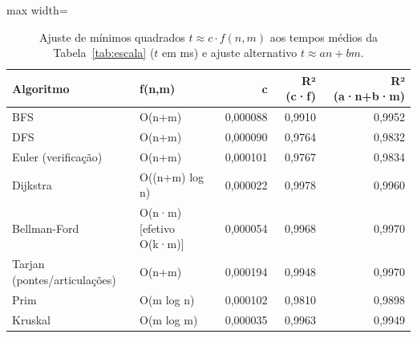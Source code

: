 \begin{table}[!htb]
\centering
\caption{Ajuste de mínimos quadrados $t \approx c\cdot f(n,m)$ aos tempos médios da Tabela~\ref{tab:escala} ($t$ em ms) e ajuste alternativo $t \approx a n + b m$.}
\label{tab:ajustes}
\begin{adjustbox}{max width=\linewidth}
\begin{tabular}{llrrr}
\toprule
Algoritmo & f(n,m) & c & R² (c·f) & R² (a·n+b·m) \\
\midrule
BFS & O(n+m) & 0,000088 & 0,9910 & 0,9952 \\
DFS & O(n+m) & 0,000090 & 0,9764 & 0,9832 \\
Euler (verificação) & O(n+m) & 0,000101 & 0,9767 & 0,9834 \\
Dijkstra & O((n+m) log n) & 0,000022 & 0,9978 & 0,9960 \\
Bellman-Ford & O(n·m) [efetivo O(k·m)] & 0,000054 & 0,9968 & 0,9970 \\
Tarjan (pontes/articulações) & O(n+m) & 0,000194 & 0,9948 & 0,9970 \\
Prim & O(m log n) & 0,000102 & 0,9810 & 0,9898 \\
Kruskal & O(m log m) & 0,000035 & 0,9963 & 0,9949 \\
\bottomrule
\end{tabular}
\end{adjustbox}
\end{table}
